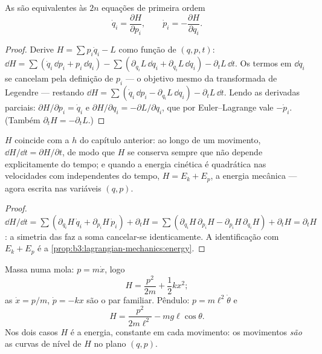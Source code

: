 \begin{theorem}\label{thm:b3:hamiltonian-mechanics:canonical}
As  são equivalentes às $2n$ equações de
primeira ordem
\[
\dot q_i = \frac{\partial H}{\partial p_i} , \qquad
\dot p_i = -\frac{\partial H}{\partial q_i} .
\]
\end{theorem}

\begin{proof}
Derive $H = \sum p_i\dot q_i - L$ como função de $(q, p, t)$:
$\dd H = \sum(\dot q_i\,\dd p_i + p_i\,\dd\dot q_i) - \sum(
\partial_{q_i}L\,\dd q_i + \partial_{\dot q_i}L\,\dd\dot q_i) -
\partial_tL\,\dd t$. Os termos em $\dd\dot q_i$ se cancelam pela
definição de $p_i$ --- o objetivo mesmo da transformada de Legendre ---
restando $\dd H = \sum(\dot q_i\,\dd p_i - \partial_{q_i}L\,\dd q_i) -
\partial_tL\,\dd t$. Lendo as derivadas parciais:
$\partial H/\partial p_i = \dot q_i$ e $\partial H/\partial q_i =
-\partial L/\partial q_i$, que por Euler--Lagrange vale $-\dot p_i$.
(Também $\partial_tH = -\partial_tL$.)
\end{proof}

\begin{proposition}[O que é $H$]\label{prop:b3:hamiltonian-mechanics:energy}
$H$ coincide com a  $h$ do capítulo anterior: ao longo de
um movimento, $\dd H/\dd t = \partial H/\partial t$, de modo que $H$ se
conserva sempre que não depende explicitamente do tempo; e quando a
energia cinética é quadrática nas velocidades com 
independentes do tempo, $H = E_k + E_p$, a energia mecânica --- agora
escrita nas variáveis $(q, p)$.
\end{proposition}

\begin{proof}
$\dd H/\dd t = \sum(\partial_{q_i}H\,\dot q_i + \partial_{p_i}H\,\dot
p_i) + \partial_tH = \sum(\partial_{q_i}H\,\partial_{p_i}H -
\partial_{p_i}H\,\partial_{q_i}H) + \partial_tH = \partial_tH$: a
simetria das  faz a soma cancelar-se identicamente.
A identificação com $E_k + E_p$ é a
\cref{prop:b3:lagrangian-mechanics:energy}.
\end{proof}

\begin{example}\label{ex:b3:hamiltonian-mechanics:examples}
Massa numa mola: $p = m\dot x$, logo
\[
H = \frac{p^2}{2m} + \frac12 kx^2 ;
\]
as  $\dot x = p/m$, $\dot p = -kx$ são o par
familiar. Pêndulo: $p = m\ell^2\dot\theta$ e
\[
H = \frac{p^2}{2m\ell^2} - mg\ell\cos\theta .
\]
Nos dois casos $H$ é a energia, constante em cada movimento: os
movimentos \emph{são} as curvas de nível de $H$ no plano $(q,p)$.
\end{example}

